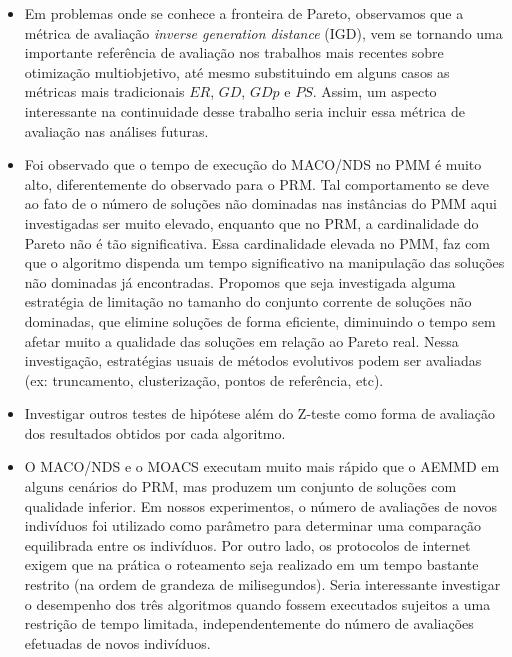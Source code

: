 \begin{itemize}
	\item Em problemas onde se conhece a fronteira de Pareto, observamos que a métrica de avaliação \textit{inverse generation distance} (IGD), vem se tornando uma importante referência de avaliação nos trabalhos mais recentes sobre otimização multiobjetivo, até mesmo substituindo em alguns casos as métricas mais tradicionais $ER$, $GD$, $GDp$ e $PS$. Assim, um aspecto interessante na continuidade desse trabalho seria incluir essa métrica de avaliação nas análises futuras. %
	
	\item Foi observado que o tempo de execução do MACO/NDS no PMM é muito alto, diferentemente do observado para o PRM. Tal comportamento se deve ao fato de o número de soluções não dominadas nas instâncias do PMM aqui investigadas ser muito elevado, enquanto que no PRM, a cardinalidade do Pareto não é tão significativa. Essa cardinalidade elevada no PMM, faz com que o algoritmo dispenda um tempo significativo na manipulação das soluções não dominadas já encontradas. Propomos que seja investigada alguma estratégia de limitação no tamanho do conjunto corrente de soluções não dominadas, que elimine soluções de forma eficiente, diminuindo o tempo sem afetar muito a qualidade das soluções em relação ao Pareto real. Nessa investigação, estratégias usuais de métodos evolutivos podem ser avaliadas (ex: truncamento, clusterização, pontos de referência, etc).
	
	\item Investigar outros testes de hipótese além do Z-teste como forma de avaliação dos resultados obtidos por cada algoritmo.

	\item O MACO/NDS e o MOACS executam muito mais rápido que o AEMMD em alguns cenários do PRM, mas produzem um conjunto de soluções com qualidade inferior. Em nossos experimentos, o número de avaliações de novos indivíduos foi utilizado como parâmetro para determinar uma comparação equilibrada entre os indivíduos. Por outro lado, os protocolos de internet exigem que na prática o roteamento seja realizado em um tempo bastante restrito (na ordem de grandeza de milisegundos). Seria interessante investigar o desempenho dos três algoritmos quando fossem executados sujeitos a uma restrição de tempo limitada, independentemente do número de avaliações efetuadas de novos indivíduos.
	

\end{itemize}

